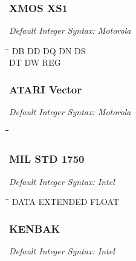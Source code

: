 \subsubsection{XMOS XS1}

{\em Default Integer Syntax: Motorola}

{\tt\begin{tabbing}
\hspace{3cm}\=\hspace{3cm}\=\hspace{3cm}\=\hspace{3cm}\=\kill
DB         \> DD          \> DQ          \> DN          \> DS \\
DT         \> DW          \> REG \\
\end{tabbing}}

\subsubsection{ATARI Vector}

{\em Default Integer Syntax: Motorola}

{\tt\begin{tabbing}
\hspace{3cm}\=\hspace{3cm}\=\hspace{3cm}\=\hspace{3cm}\=\kill
\end{tabbing}}

\subsubsection{MIL STD 1750}

{\em Default Integer Syntax: Intel}

{\tt\begin{tabbing}
\hspace{3cm}\=\hspace{3cm}\=\hspace{3cm}\=\hspace{3cm}\=\kill
DATA       \> EXTENDED    \> FLOAT \\
\end{tabbing}}

\subsubsection{KENBAK}

{\em Default Integer Syntax: Intel}

